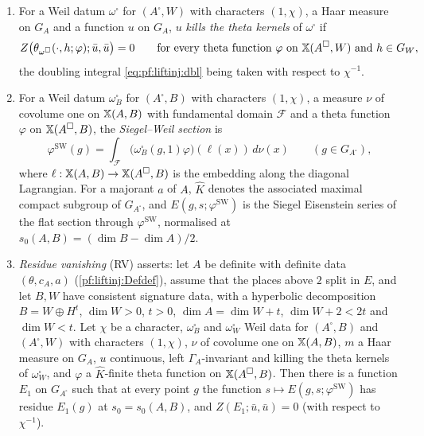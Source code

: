 \begin{definition}\label{pf:liftinj:RVdef}
\begin{enumerate}[label=(\alph*)]
\item For a Weil datum $\omega^\square$ for $(A^\square,W)$ with characters $(1,\chi)$, a Haar measure on $G_A$ and a function $u$ on $G_A$, $u$
\emph{kills the theta kernels} of $\omega^\square$ if
\begin{equation}\label{eq:pf:liftinj:kills}
Z\bigl(\theta_{\omega^\square}(\cdot,h;\varphi);\bar u,\bar u\bigr)=0
\qquad\text{for every theta function }\varphi\text{ on }\mathbb{X}(A^\square,W)\text{ and }h\in G_W,
\end{equation}
the doubling integral \eqref{eq:pf:liftinj:dbl} being taken with respect to $\chi^{-1}$.
\item For a Weil datum $\omega_B^\square$ for $(A^\square,B)$ with characters $(1,\chi)$, a measure $\nu$ of covolume one on $\mathbb{X}(A,B)$ with
fundamental domain $\mathcal F$ and a theta function $\varphi$ on $\mathbb{X}(A^\square,B)$, the \emph{Siegel--Weil section} is
\begin{equation}\label{eq:pf:liftinj:swsec}
\varphi^{\mathrm{SW}}(g)=\int_{\mathcal F}\bigl(\omega_B^\square(g,1)\varphi\bigr)(\ell(x))\,d\nu(x)\qquad(g\in G_{A^\square}),
\end{equation}
where $\ell:\mathbb{X}(A,B)\to\mathbb{X}(A^\square,B)$ is the embedding along the diagonal Lagrangian. For a majorant $a$ of $A$, $\hat K$ denotes
the associated maximal compact subgroup of $G_{A^\square}$, and $E(g,s;\varphi^{\mathrm{SW}})$ is the Siegel Eisenstein series of the flat section
through $\varphi^{\mathrm{SW}}$, normalised at $s_0(A,B)=(\dim B-\dim A)/2$.
\item \emph{Residue vanishing} (RV) asserts: let $A$ be definite with definite data $(\theta,c_A,a)$ (\cref{pf:liftinj:Defdef}), assume that the
places above $2$ split in $E$, and let $B,W$ have consistent signature data, with a hyperbolic decomposition $B=W\oplus H^t$, $\dim W>0$, $t>0$,
$\dim A=\dim W+t$, $\dim W+2<2t$ and $\dim W<t$. Let $\chi$ be a character, $\omega_B^\square$ and $\omega_W^\square$ Weil data for $(A^\square,B)$
and $(A^\square,W)$ with characters $(1,\chi)$, $\nu$ of covolume one on $\mathbb{X}(A,B)$, $m$ a Haar measure on $G_A$, $u$ continuous, left
$\Gamma_A$-invariant and killing the theta kernels of $\omega_W^\square$, and $\varphi$ a $\hat K$-finite theta function on $\mathbb{X}(A^\square,B)$.
Then there is a function $E_1$ on $G_{A^\square}$ such that at every point $g$ the function $s\mapsto E(g,s;\varphi^{\mathrm{SW}})$ has residue
$E_1(g)$ at $s_0=s_0(A,B)$, and $Z(E_1;\bar u,\bar u)=0$ (with respect to $\chi^{-1}$).
\end{enumerate}
\end{definition}

